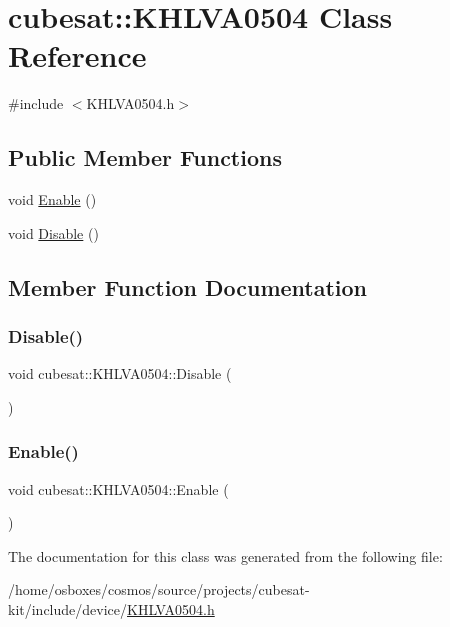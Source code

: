 \hypertarget{classcubesat_1_1KHLVA0504}{}\section{cubesat\+:\+:K\+H\+L\+V\+A0504 Class Reference}
\label{classcubesat_1_1KHLVA0504}


{\ttfamily \#include $<$K\+H\+L\+V\+A0504.\+h$>$}

\subsection*{Public Member Functions}
\begin{DoxyCompactItemize}
\item 
void \hyperlink{classcubesat_1_1KHLVA0504_a6aa41de16a51df29cf4ba99cf6533bba}{Enable} ()
\item 
void \hyperlink{classcubesat_1_1KHLVA0504_aa9ca7967617d398e01c07b6d00d1f7fe}{Disable} ()
\end{DoxyCompactItemize}


\subsection{Member Function Documentation}
\mbox{\label{classcubesat_1_1KHLVA0504_aa9ca7967617d398e01c07b6d00d1f7fe}} 
\subsubsection{\texorpdfstring{Disable()}{Disable()}}
{\footnotesize\ttfamily void cubesat\+::\+K\+H\+L\+V\+A0504\+::\+Disable (\begin{DoxyParamCaption}{ }\end{DoxyParamCaption})}

\mbox{\label{classcubesat_1_1KHLVA0504_a6aa41de16a51df29cf4ba99cf6533bba}} 
\subsubsection{\texorpdfstring{Enable()}{Enable()}}
{\footnotesize\ttfamily void cubesat\+::\+K\+H\+L\+V\+A0504\+::\+Enable (\begin{DoxyParamCaption}{ }\end{DoxyParamCaption})}



The documentation for this class was generated from the following file\+:\begin{DoxyCompactItemize}
\item 
/home/osboxes/cosmos/source/projects/cubesat-\/kit/include/device/\hyperlink{KHLVA0504_8h}{K\+H\+L\+V\+A0504.\+h}\end{DoxyCompactItemize}
